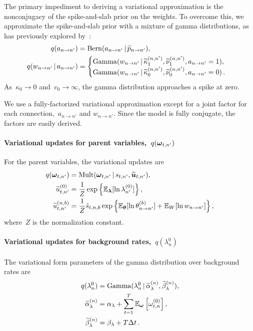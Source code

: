 The primary impediment to deriving a variational approximation is the
nonconjugacy of the spike-and-slab prior on the weights.  To overcome
this, we approximate the spike-and-slab prior with a mixture of gamma
distributions, as has previously explored by~\citet{Grabska-2013}:
\begin{align*}
q(a_{n \to n'}) &= \mathrm{Bern}(a_{n \to n'} \,|\, \widetilde{p}_{n \to n'}), \\
q(w_{n \to n'} \,|\, a_{n \to n'}) &=
\begin{cases} 
\mathrm{Gamma}(w_{n \to n'} \,|\, \widetilde{\kappa}_1^{(n, n')}, \widetilde{\nu}_1^{(n,n')}, a_{n \to n'} =1), \\
\mathrm{Gamma}(w_{n \to n'} \,|\, \widetilde{\kappa}_0^{(n, n')}, \widetilde{\nu}_0^{(n, n')}, a_{n \to n'} =0)\,.
\end{cases}
\end{align*}
As~$\kappa_0 \to 0$ and~$v_0\to \infty$, the gamma distribution
approaches a spike at zero.

We use a fully-factorized variational approximation except for a joint
factor for each connection,~$a_{n\to n'}$ and $w_{n \to n'}$.  Since
the model is fully conjugate, the factors are easily derived.

\paragraph{Variational updates for parent variables,~$q(\boldsymbol{\omega}_{t, n'})$} 
For the parent variables, the variational updates are
\begin{align*}
q(\boldsymbol{\omega}_{t,n'}) &= \mathrm{Mult}(\boldsymbol{\omega}_{t, n'} \,|\, s_{t,n'}, \widetilde{\boldsymbol{u}}_{t,n'}), \\
\widetilde{u}_{t,n'}^{(0)} &= \frac{1}{Z} \exp\left\{\mathbb{E}_{\boldsymbol{\lambda}}[\ln \lambda_{n'}^{(0)}]\right\}, \\
\widetilde{u}_{t,n'}^{(n,b)} &= \frac{1}{Z} \hat{s}_{t,n,b} \exp\left\{\mathbb{E}_{\boldsymbol{\theta}} [\ln \theta_{n \to n'}^{(b)}] + \mathbb{E}_W[\ln w_{n \to n'}]\right\},
\end{align*}
where~$Z$ is the normalization constant.

\paragraph{Variational updates for background rates,~$q(\lambda_n^0)$}
The variational form parameters of the gamma distribution over
background rates are
\begin{align*}
q(\lambda_n^0) &= \mathrm{Gamma}(\lambda_n^{0} \,|\, \widetilde{\alpha}_{\lambda}^{(n)}, \widetilde{\beta}_{\lambda}^{(n)}),  \\
\widetilde{\alpha}_{\lambda}^{(n)} &= \alpha_\lambda + \sum_{t=1}^T \mathbb{E}_{\boldsymbol{\omega}}\left[ \omega_{t,n}^{(0)}\right], \\
\widetilde{\beta}_{\lambda}^{(n)} &= \beta_\lambda + T \Delta t\,.
\end{align*}


